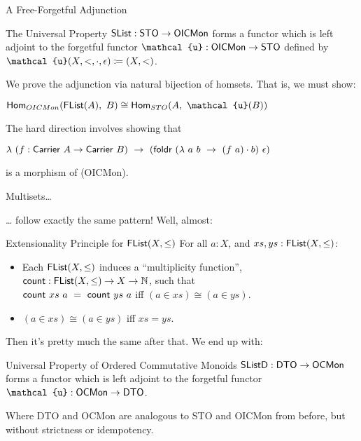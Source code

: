 \documentclass{beamer}
\begin{document}
\begin{frame}{A Free-Forgetful Adjunction}
\begin{block}{The Universal Property}
   $\AgdaDatatype{SList} : \AgdaDatatype{STO} \to \AgdaDatatype{OICMon}$ forms a functor which is left adjoint to the forgetful functor $\AgdaDatatype{\ensuremath{\mathcal{u}}} : \AgdaDatatype{OICMon} \to \AgdaDatatype{STO}$ defined by $\AgdaDatatype{\ensuremath{\mathcal{u}}}(X,<,\cdot,\epsilon) \coloneq (X,<)$.
 \end{block}
 \pause
We prove the adjunction via natural bijection of homsets. That is, we must show:

\begin{center}
  $\mathsf{Hom}_{OICMon}(\AgdaDatatype{FList}(A),~B) \cong \mathsf{Hom}_{STO}(A,~ \AgdaDatatype{\ensuremath{\mathcal{u}}}(B))$
\end{center}
\pause

The hard direction involves showing that
\begin{center}
$\lambda~(f : \AgdaField{Carrier}~A \to \AgdaField{Carrier}~B)~\to~(\AgdaFunction{foldr}~(\lambda~a~b~\to~(f~a) \cdot b)~\epsilon)$
\end{center}
is a morphism of \AgdaDatatype(OICMon).


\end{frame}

\begin{frame}{Multisets\ldots{}}

  \ldots{} follow exactly the same pattern! Well, almost:

  \begin{block}{Extensionality Principle for $\AgdaDatatype{FList}(X, \leq)$}
    For all $a : X$, and $xs, ys : \AgdaDatatype{FList}(X, \leq)$:
  \begin{itemize}
    \item Each $\AgdaDatatype{FList}(X, \leq)$ induces a ``multiplicity function'', $\AgdaFunction{count} : \AgdaDatatype{FList}(X,\leq) \to X \to \mathbb{N}$, such that \\
          $\AgdaFunction{count}~xs~a~=~\AgdaFunction{count}~ys~a$ iff $(a \in xs) \cong (a \in ys) $.
    \item $(a \in xs) \cong (a \in ys)$ iff $xs = ys$.
  \end{itemize}
 \end{block}

 Then it's pretty much the same after that. We end up with:

 \begin{block}{Universal Property of Ordered Commutative Monoids}
   $\AgdaDatatype{SListD} : \AgdaDatatype{DTO} \to \AgdaDatatype{OCMon}$ forms a functor which is left adjoint to the forgetful functor $\AgdaDatatype{\ensuremath{\mathcal{u}}} : \AgdaDatatype{OCMon} \to \AgdaDatatype{DTO}$.
 \end{block}

 Where DTO and OCMon are analogous to STO and OICMon from before, but without strictness or idempotency.
\end{frame}
\end{document}
